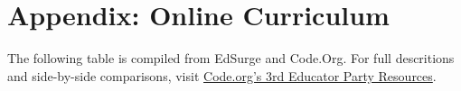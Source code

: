 
\chapter{Appendix: Online Curriculum} %

\label{AppendixTools} %


The following table is compiled from EdSurge\cite{edsurgetab} and Code.Org\cite{codeapps}. For full descritions and side-by-side comparisons, visit \href{https://code.org/educate/3rdparty}{Code.org's 3rd Educator Party Resources}.
\footnotesize
